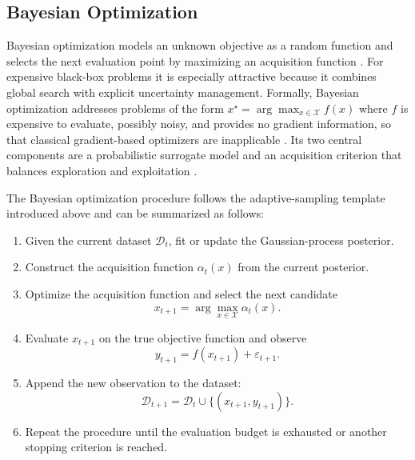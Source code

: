 \documentclass[12pt,a4paper]{report}
\begin{document}
        \subsection{Bayesian Optimization}
        Bayesian optimization models an unknown objective as a random function and selects the next evaluation point by maximizing an acquisition function \cite{snoek2012practical}. For expensive black-box problems it is especially attractive because it combines global search with explicit uncertainty management. Formally, Bayesian optimization addresses problems of the form $x^{\star} = \arg\max_{x \in \mathcal{X}} f(x)$ where $f$ is expensive to evaluate, possibly noisy, and provides no gradient information, so that classical gradient-based optimizers are inapplicable \cite{snoek2012practical}. Its two central components are a probabilistic surrogate model and an acquisition criterion that balances exploration and exploitation \cite{snoek2012practical}.

        The Bayesian optimization procedure follows the adaptive-sampling template
        introduced above and can be summarized as follows:

        \begin{enumerate}
            \item Given the current dataset $\mathcal{D}_t$, fit or update the
            Gaussian-process posterior.

            \item Construct the acquisition function $\alpha_t(x)$ from the current
            posterior.

            \item Optimize the acquisition function and select the next candidate
            \[
                x_{t+1} = \arg\max_{x \in \mathcal{X}} \alpha_t(x).
            \]

            \item Evaluate $x_{t+1}$ on the true objective function and observe
            \[
                y_{t+1} = f(x_{t+1}) + \varepsilon_{t+1}.
            \]

            \item Append the new observation to the dataset:
            \[
                \mathcal{D}_{t+1}
                =
                \mathcal{D}_t \cup \{(x_{t+1},y_{t+1})\}.
            \]

            \item Repeat the procedure until the evaluation budget is exhausted or
            another stopping criterion is reached.
        \end{enumerate}
\end{document}
